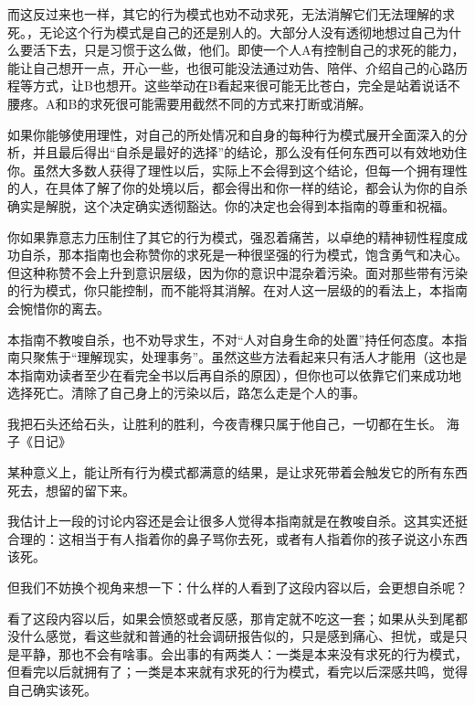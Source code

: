 而这反过来也一样，其它的行为模式也劝不动求死，无法消解它们无法理解的求死。，无论这个行为模式是自己的还是别人的。大部分人没有透彻地想过自己为什么要活下去，只是习惯于这么做，他们。即使一个人A有控制自己的求死的能力，能让自己想开一点，开心一些，也很可能没法通过劝告、陪伴、介绍自己的心路历程等方式，让B也想开。这些举动在B看起来很可能无比苍白，完全是站着说话不腰疼。A和B的求死很可能需要用截然不同的方式来打断或消解。

如果你能够使用理性，对自己的所处情况和自身的每种行为模式展开全面深入的分析，并且最后得出“自杀是最好的选择”的结论，那么没有任何东西可以有效地劝住你。虽然大多数人获得了理性以后，实际上不会得到这个结论，但每一个拥有理性的人，在具体了解了你的处境以后，都会得出和你一样的结论，都会认为你的自杀确实是解脱，这个决定确实透彻豁达。你的决定也会得到本指南的尊重和祝福。

你如果靠意志力压制住了其它的行为模式，强忍着痛苦，以卓绝的精神韧性程度成功自杀，那本指南也会称赞你的求死是一种很坚强的行为模式，饱含勇气和决心。但这种称赞不会上升到意识层级，因为你的意识中混杂着污染。面对那些带有污染的行为模式，你只能控制，而不能将其消解。在对人这一层级的的看法上，本指南会惋惜你的离去。

本指南不教唆自杀，也不劝导求生，不对“人对自身生命的处置”持任何态度。本指南只聚焦于“理解现实，处理事务”。虽然这些方法看起来只有活人才能用（这也是本指南劝读者至少在看完全书以后再自杀的原因），但你也可以依靠它们来成功地选择死亡。清除了自己身上的污染以后，路怎么走是个人的事。
\begin{examples}
我把石头还给石头，让胜利的胜利，今夜青稞只属于他自己，一切都在生长。
\raggedleft 海子《日记》
\end{examples}
某种意义上，能让所有行为模式都满意的结果，是让求死带着会触发它的所有东西死去，想留的留下来。


我估计上一段的讨论内容还是会让很多人觉得本指南就是在教唆自杀。这其实还挺合理的：这相当于有人指着你的鼻子骂你去死，或者有人指着你的孩子说这小东西该死。

但我们不妨换个视角来想一下：什么样的人看到了这段内容以后，会更想自杀呢？

看了这段内容以后，如果会愤怒或者反感，那肯定就不吃这一套；如果从头到尾都没什么感觉，看这些就和普通的社会调研报告似的，只是感到痛心、担忧，或是只是平静，那也不会有啥事。会出事的有两类人：一类是本来没有求死的行为模式，但看完以后就拥有了；一类是本来就有求死的行为模式，看完以后深感共鸣，觉得自己确实该死。

